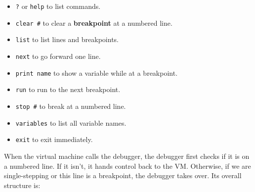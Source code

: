 \documentclass[krantzl]{krantz}
\newcommand{\glossref}[1]{\textbf{#1}}
\begin{document}
\begin{itemize}

\item 

\texttt{?} or \texttt{help} to list commands.



\item 

\texttt{clear \#} to clear a \glossref{breakpoint} at a numbered line.



\item 

\texttt{list} to list lines and breakpoints.



\item 

\texttt{next} to go forward one line.



\item 

\texttt{print name} to show a variable while at a breakpoint.



\item 

\texttt{run} to run to the next breakpoint.



\item 

\texttt{stop \#} to break at a numbered line.



\item 

\texttt{variables} to list all variable names.



\item 

\texttt{exit} to exit immediately.



\end{itemize}


When the virtual machine calls the debugger,
the debugger first checks if it is on a numbered line.
If it isn’t,
it hands control back to the VM.
Otherwise,
if we are single-stepping or this line is a breakpoint,
the debugger takes over.
Its overall structure is:
\end{document}
